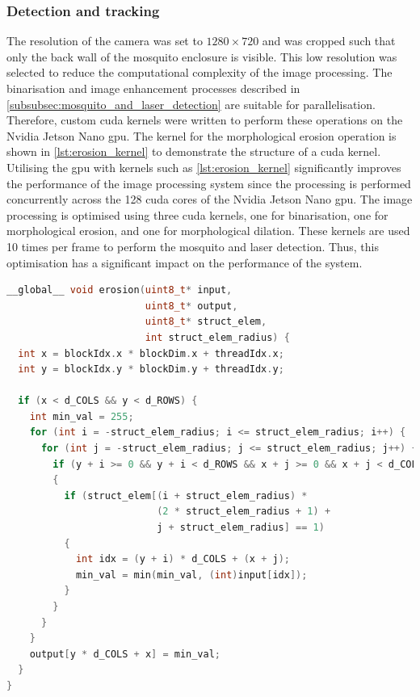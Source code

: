 \subsubsection{Detection and tracking}
The resolution of the camera was set to $1280 \times 720$ and was cropped such that only the back wall of the mosquito enclosure is visible. This low resolution was selected to reduce the computational complexity of the image processing. The binarisation and image enhancement processes described in \autoref{subsubsec:mosquito_and_laser_detection} are suitable for parallelisation. Therefore, custom \gls{cuda} kernels were written to perform these operations on the Nvidia Jetson Nano \gls{gpu}. The kernel for the morphological erosion operation is shown in \autoref{lst:erosion_kernel} to demonstrate the structure of a \gls{cuda} kernel. Utilising the \gls{gpu} with kernels such as \autoref{lst:erosion_kernel} significantly improves the performance of the image processing system since the processing is performed concurrently across the 128 \gls{cuda} cores of the Nvidia Jetson Nano \gls{gpu}. The image processing is optimised using three \gls{cuda} kernels, one for binarisation, one for morphological erosion, and one for morphological dilation. These kernels are used 10 times per frame to perform the mosquito and laser detection. Thus, this optimisation has a significant impact on the performance of the system.

\begin{minipage}{\linewidth}
  \begin{lstlisting}[label={lst:erosion_kernel}, language=C++, caption={Erosion GPU kernel.}]
__global__ void erosion(uint8_t* input,
                        uint8_t* output,
                        uint8_t* struct_elem,
                        int struct_elem_radius) {
  int x = blockIdx.x * blockDim.x + threadIdx.x;
  int y = blockIdx.y * blockDim.y + threadIdx.y;
  
  if (x < d_COLS && y < d_ROWS) {
    int min_val = 255;
    for (int i = -struct_elem_radius; i <= struct_elem_radius; i++) {
      for (int j = -struct_elem_radius; j <= struct_elem_radius; j++) {
        if (y + i >= 0 && y + i < d_ROWS && x + j >= 0 && x + j < d_COLS) 
        {
          if (struct_elem[(i + struct_elem_radius) *
                          (2 * struct_elem_radius + 1) +
                          j + struct_elem_radius] == 1) 
          {
            int idx = (y + i) * d_COLS + (x + j);
            min_val = min(min_val, (int)input[idx]);
          }
        }
      }
    }
    output[y * d_COLS + x] = min_val;
  }
}
\end{lstlisting}
\end{minipage}


